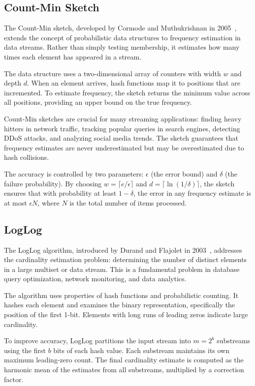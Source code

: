 \subsection{Count-Min Sketch}

The Count-Min sketch, developed by Cormode and Muthukrishnan in 2005~\cite{cormode2005improved}, extends the concept of probabilistic data structures to frequency estimation in data streams. Rather than simply testing membership, it estimates how many times each element has appeared in a stream.

The data structure uses a two-dimensional array of counters with width $w$ and depth $d$. When an element arrives, hash functions map it to positions that are incremented. To estimate frequency, the sketch returns the minimum value across all positions, providing an upper bound on the true frequency.

Count-Min sketches are crucial for many streaming applications: finding heavy hitters in network traffic, tracking popular queries in search engines, detecting DDoS attacks, and analyzing social media trends. The sketch guarantees that frequency estimates are never underestimated but may be overestimated due to hash collisions.

The accuracy is controlled by two parameters: $\epsilon$ (the error bound) and $\delta$ (the failure probability). By choosing $w = \lceil e/\epsilon \rceil$ and $d = \lceil \ln(1/\delta) \rceil$, the sketch ensures that with probability at least $1-\delta$, the error in any frequency estimate is at most $\epsilon N$, where $N$ is the total number of items processed.

\subsection{LogLog}

The LogLog algorithm, introduced by Durand and Flajolet in 2003~\cite{durand2003loglog}, addresses the cardinality estimation problem: determining the number of distinct elements in a large multiset or data stream. This is a fundamental problem in database query optimization, network monitoring, and data analytics.

The algorithm uses properties of hash functions and probabilistic counting. It hashes each element and examines the binary representation, specifically the position of the first 1-bit. Elements with long runs of leading zeros indicate large cardinality.

To improve accuracy, LogLog partitions the input stream into $m = 2^b$ substreams using the first $b$ bits of each hash value. Each substream maintains its own maximum leading-zero count. The final cardinality estimate is computed as the harmonic mean of the estimates from all substreams, multiplied by a correction factor.

